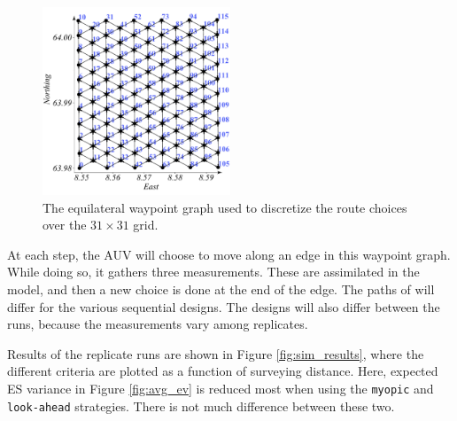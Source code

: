 \documentclass[aoas]{imsart}
\begin{document}
\begin{figure}[h]
\centering
\includegraphics[width=0.50\textwidth]{Figures/sim/wp_graph_paper.pdf}
\caption{The equilateral waypoint graph used to discretize the route choices over the $31\times31$ grid.}
\label{fig:wp_graph}
\end{figure}

At each step, the AUV will choose to move along an edge in this waypoint
graph. While doing so, it gathers three measurements. These are
assimilated in the model, and then a new choice is done at the end of
the edge. The paths of will differ for the various sequential designs.
The designs will also differ between the runs, because the measurements
vary among replicates.


Results of the replicate runs are shown in Figure \ref{fig:sim_results},
where the different criteria are plotted as a function of surveying
distance. Here, expected ES variance in Figure \ref{fig:avg_ev} is
reduced most when using the \texttt{myopic} and \texttt{look-ahead}
strategies. There is not much difference between these two.  
\end{document}
